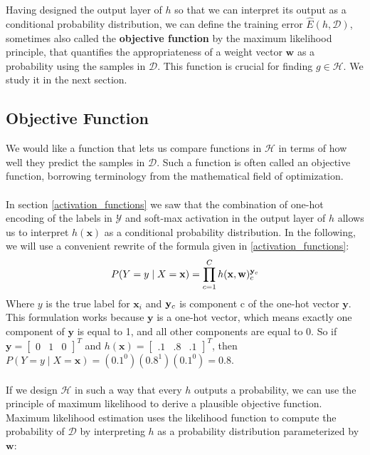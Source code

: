\\\\
Having designed the output layer of $h$ so that we can interpret its output as a conditional probability distribution, we can define the training error $\hat{E}(h, \mathcal{D})$, sometimes also called the \textbf{objective function} by the maximum likelihood principle, that quantifies the appropriateness of a weight vector $\mathbf{w}$ as a probability using the samples in $\mathcal{D}$. This function is crucial for finding $g \in \mathcal{H}$. We study it in the next section.

\subsection{Objective Function}
\label{objectiveFunction}
We would like a function that lets us compare functions in $\mathcal{H}$ in terms of how well they predict the samples in $\mathcal{D}$. Such a function is often called an objective function, borrowing terminology from the mathematical field of optimization.
\\\\
In section \ref{activation_functions} we saw that the combination of one-hot encoding of the labels in $\mathcal{Y}$ and soft-max activation in the output layer of $h$ allows us to interpret $h(\mathbf{x})$ as a conditional probability distribution. In the following, we will use a convenient rewrite of the formula given in \ref{activation_functions}:
$$
P(Y = y \mid X = \mathbf{x}) = \prod\limits_{c=1}^C h(\mathbf{x},\mathbf{w})^{\mathbf{y}_c}_c
$$
Where $y$ is the true label for $\mathbf{x}_i$ and $\mathbf{y}_c$ is component c of the one-hot vector $\mathbf{y}$. 
This formulation works because $\mathbf{y}$ is a one-hot vector, which means exactly one component of $\mathbf{y}$ is equal to 1, and all other components are equal to 0. So if $\mathbf{y} = \begin{bmatrix}0 & 1 & 0 \end{bmatrix}^T$ and $h(\mathbf{x}) = \begin{bmatrix}.1 & .8 & .1 \end{bmatrix}^T$, then $P(Y = y \mid X = \mathbf{x}) = (0.1^0)(0.8^1)(0.1^0) = 0.8$.
\\\\
If we design $\mathcal{H}$ in such a way that every $h$ outputs a probability, we can use the principle of maximum likelihood to derive a plausible objective function. Maximum likelihood estimation uses the likelihood function to compute the probability of $\mathcal{D}$ by interpreting $h$ as a probability distribution parameterized by $\mathbf{w}$:

